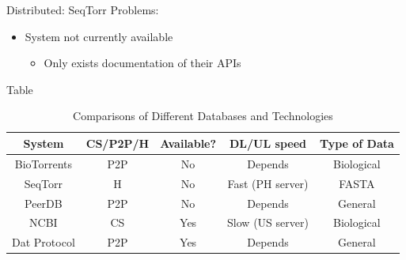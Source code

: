 \documentclass{beamer}
\begin{document}
    
    \begin{frame}{Distributed: SeqTorr}
        Problems: 
        \begin{itemize}
            \item System not currently available
            \begin{itemize}
                \item Only exists documentation of their APIs
            \end{itemize}
        \end{itemize}
    \end{frame}
    
    \begin{frame}{Table}

\begin{table}[h]
    \caption{Comparisons of Different Databases and Technologies}
    \label{table:database_comparison_table}
    \begin{tabular}{ccccc}
    \toprule
    System      & CS/P2P/H & Available? & DL/UL speed & Type of Data \\ 
    \midrule
    BioTorrents & P2P           & No         & Depends                    & Biological  \\ 
    SeqTorr     & H             & No         & Fast (PH server)           & FASTA        \\ 
    PeerDB      & P2P           & No         & Depends                    & General      \\ 
    NCBI        & CS            & Yes        & Slow (US server)           & Biological  \\
    Dat Protocol    & P2P      & Yes        & Depends           & General  \\ 
    \bottomrule
    \end{tabular}
\end{table} 
\end{frame}

\end{document}

